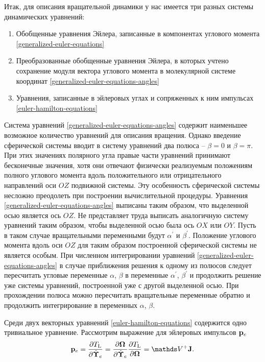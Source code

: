 Итак, для описания вращательной динамики у нас имеется три разных системы динамических уравнений:
\begin{enumerate}
    \item Обобщенные уравнения Эйлера, записанные в компонентах углового момента \eqref{generalized-euler-equations}
    \item Преобразованные обобщенные уравнения Эйлера, в которых учтено сохранение модуля вектора углового момента в молекулярной системе координат \eqref{generalized-euler-equations-angles}
    \item Уравнения, записанные в эйлеровых углах и сопряженных к ним импульсах \eqref{euler-hamilton-equations}
\end{enumerate}

Система уравнений \eqref{generalized-euler-equations-angles} содержит наименьшее возможное количество уравнений для описания вращения. Однако введение сферической системы вводит в систему уравнений два полюса -- $\beta = 0$ и $\beta = \pi$. При этих значениях полярного угла правые части уравнений принимают бесконечные значения, хотя они отвечают физически реализуемым положениям полного углового момента вдоль положительного или отрицательного направлений оси $OZ$ подвижной системы. Эту особенность сферической системы несложно преодолеть при построении вычислительной процедуры. Уравнения \eqref{generalized-euler-equations-angles} выписаны таким образом, что выделенной осью является ось $OZ$. Не представляет труда выписать аналогичную систему уравнений таким образом, чтобы выделенной осью была ось $OX$ или $OY$. Пусть в таком случае вращательными переменными будут $\alpha^\prime$ и $\beta^\prime$. Положение углового момента вдоль оси $OZ$ для таким образом построенной сферической системы не является особым. При численном интегрировании уравнений \eqref{generalized-euler-equations-angles} в случае приближения решения к одному из полюсов следует пересчитать угловые переменные $\alpha$, $\beta$ в переменные $\alpha^\prime$, $\beta^\prime$ и продолжить решение уже системы уравнений, построенной уже с другой выделенной осью. При прохождении полюса можно пересчитать вращательные переменные обратно и продолжить интегрирование в переменных $\alpha$, $\beta$. \par
Среди двух векторных уравнений \eqref{euler-hamilton-equations} содержится одно тривиальное уравнение. Рассмотрим выражение для эйлеровых импульсов $\mathbf{p}_e$
\begin{gather}
    \pe = \frac{\partial \Tl}{\partial \dot{\boldsymbol{\Upsilon}}_e} = \frac{\partial \bOmega}{\partial \dot{\boldsymbol{\Upsilon}}_e} \frac{\partial \Tl}{\partial \bOmega} = \bbV^+ \mf{J}.
\end{gather}

